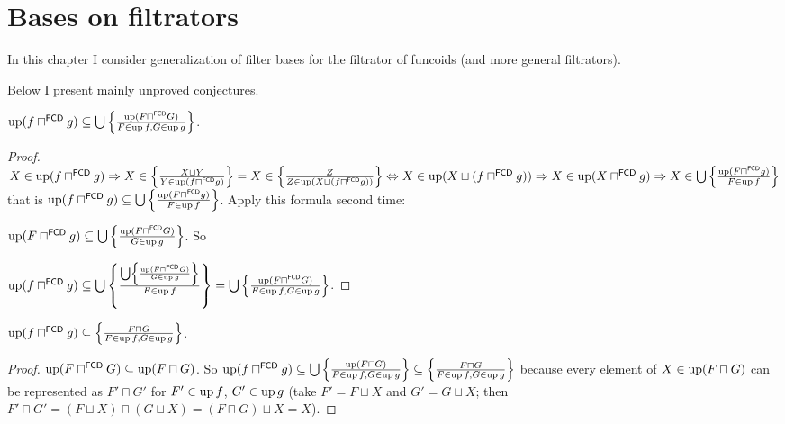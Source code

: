 \chapter{Bases on filtrators}

In this chapter I consider generalization of filter bases
for the filtrator of funcoids (and more general filtrators).

Below I present mainly unproved conjectures.

\begin{lem}
$\operatorname{up} (f \sqcap^{\mathsf{FCD}} g) \subseteq \bigcup \left\{ \frac{
\operatorname{up} (F \sqcap^{\mathsf{FCD}} G) }{ F \in \operatorname{up} f, G \in \operatorname{up} g }\right\}$.
\end{lem}

\begin{proof}
$X \in \operatorname{up} (f \sqcap^{\mathsf{FCD}} g) \Rightarrow X \in \left\{ \frac{
X \sqcup Y }{ Y \in \operatorname{up} (f
\sqcap^{\mathsf{FCD}} g) }\right\} = X \in \left\{ \frac{ Z }{ Z \in \operatorname{up} (X \sqcup (f \sqcap^{\mathsf{FCD}} g))
}\right\} \Leftrightarrow X \in \operatorname{up} (X \sqcup (f
\sqcap^{\mathsf{FCD}} g)) \Rightarrow X \in \operatorname{up} (X
\sqcap^{\mathsf{FCD}} g) \Rightarrow X \in \bigcup \left\{ \frac{ \operatorname{up} (F
\sqcap^{\mathsf{FCD}} g) }{ F \in \operatorname{up} f
}\right\}$ that is $\operatorname{up} (f \sqcap^{\mathsf{FCD}} g) \subseteq
\bigcup \left\{ \frac{ \operatorname{up} (F \sqcap^{\mathsf{FCD}} g) }{
F \in \operatorname{up} f }\right\}$. Apply this formula second time:

$\operatorname{up} (F \sqcap^{\mathsf{FCD}} g) \subseteq \bigcup \left\{ \frac{
\operatorname{up} (F \sqcap^{\mathsf{FCD}} G) }{ G \in
\operatorname{up} g }\right\}$. So

$\operatorname{up} (f \sqcap^{\mathsf{FCD}} g) \subseteq \bigcup \left\{ \frac{
\bigcup \left\{ \frac{ \operatorname{up} (F \sqcap^{\mathsf{FCD}} G) }{ G \in \operatorname{up} g }\right\} }{ F \in
\operatorname{up} f }\right\} = \bigcup \left\{ \frac{ \operatorname{up} (F
\sqcap^{\mathsf{FCD}} G) }{ F \in \operatorname{up} f,
G \in \operatorname{up} g }\right\}$.
\end{proof}

\begin{prop}
$\operatorname{up} (f \sqcap^{\mathsf{FCD}} g) \subseteq \left\{ \frac{ F \sqcap G }{ F \in \operatorname{up} f, G \in \operatorname{up} g }\right\}$.
\end{prop}

\begin{proof}
$\operatorname{up} (F \sqcap^{\mathsf{FCD}} G) \subseteq \operatorname{up} (F
\sqcap G)$. So $\operatorname{up} (f \sqcap^{\mathsf{FCD}} g) \subseteq \bigcup
\left\{ \frac{ \operatorname{up} (F \sqcap G) }{ F \in \operatorname{up} f,
G \in \operatorname{up} g }\right\} \subseteq \left\{ \frac{ F \sqcap G }{ F \in \operatorname{up} f, G \in \operatorname{up} g }\right\}$ because every
element of $X \in \operatorname{up} (F \sqcap G)$ can be represented as $F' \sqcap G'$
for $F' \in \operatorname{up} f$, $G' \in \operatorname{up} g$ (take $F' = F \sqcup X$ and $G'
= G \sqcup X$; then $F' \sqcap G' = (F \sqcup X) \sqcap (G \sqcup X) = (F
\sqcap G) \sqcup X = X$).
\end{proof}

